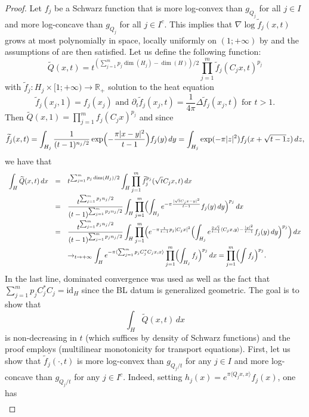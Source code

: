 \documentclass[11pt,a4paper,reqno]{amsart}
\numberwithin{equation}{section}
\theoremstyle{definition}
\newcommand{\nm}{\noalign{\smallskip}}
\newcommand{\ds}{\displaystyle}
\renewcommand{\tilde}{\widetilde}
\newcommand{\<}{\ensuremath \leq}
\renewcommand{\>}{\ensuremath \geq}
\renewcommand{\tilde}{\widetilde}
\begin{document}
\begin{proof}
Let $f_j$ be a Schwarz function that is more log-convex than $g_{Q_j}$ for all $j \in I$ and more log-concave than $g_{Q_j}$ for all $j \in I^c$. This implies that $\nabla \log \tilde f_j(x,t)$ grows at most polynomially in space, locally uniformly on $(1;+\infty)$ by \cite{Vald2} and the assumptions of \cite[Lemma 2.6]{BCCT} are then satisfied.
Let us define the following function:
$$\tilde Q(x,t)=t^{(\sum_{j=1}^m p_j\dim(H_j)-\dim(H))/2}\prod_{j=1}^m \tilde f_j(C_jx,t)^{p_j}$$ with $\tilde f_j: H_j \times [1;+\infty) \rightarrow \mathbb{R}_+$ solution to the heat equation  $$\tilde f_j(x_j,1)=f_j(x_j) \text{ and } \partial_t \tilde f_j(x_j,t)=\frac{1}{4\pi}\Delta \tilde f_j(x_j,t) \text{ for } t>1.$$
Then $\tilde Q(x,1)= \prod_{j=1}^m f_j(C_jx)^{p_j}$ and since $$\tilde f_j(x,t)=\int_{H_j}\frac{1}{(t-1)^{n_j/2}}\exp \Bigl(-\frac{\pi|x-y|^2}{t-1} \Bigl) f_j(y)\, dy=\int_{H_j}\exp(-\pi|z|^2)f_j(x+\sqrt{t-1}z)\, dz,$$ we have that $$\begin{array}{lll}
\ds \int_H \tilde Q(x,t)\, dx &=& \ds t^{\sum_{j=1}^m p_j\dim(H_j)/2}\int_H \prod_{j=1}^m \tilde f_j^{p_j}(\sqrt{t}C_jx,t)\, dx \\
\nm 
&=& \ds \frac{t^{\sum_{j=1}^m p_jn_j/2}}{(t-1)^{\sum_{j=1}^m p_jn_j/2}}\int_H \prod_{j=1}^m \Bigl( \int_{H_j} e^{-\pi \frac{|\sqrt{t} C_jx-y|^2}{t-1}} f_j(y)\, dy \Bigl)^{p_j}\, dx \\
\nm 
&=& \ds \frac{t^{\sum_{j=1}^m p_jn_j/2}}{(t-1)^{\sum_{j=1}^m p_jn_j/2}} \int_H \prod_{j=1}^m \Bigl( e^{-\pi \frac{t}{t-1}p_j|C_jx|^2} \Bigl(\int_{H_j}  e^{\frac{2\sqrt{t}}{t-1}\langle C_jx,y\rangle-\frac{|y|^2}{t-1}}f_j(y)\, dy\Bigl)^{p_j} \Bigl)\, dx\\
\nm 
&& \ds \rightarrow_{t \rightarrow +\infty} \int_H e^{-\pi \langle \sum_{j=1}^m p_jC_j^*C_jx,x\rangle}\prod_{j=1}^m \Bigl(\int_{H_j}f_j\Bigl)^{p_j}\, dx = \prod_{j=1}^m \Bigl( \int f_j \Bigl)^{p_j}.
\end{array}$$ In the last line, dominated convergence was used as well as the fact that $\sum_{j=1}^m p_jC_j^*C_j=\mathrm{id}_H$ since the BL datum is generalized geometric.
The goal is to show that $$\int_H \tilde Q(x,t)\, dx$$ is non-decreasing in $t$ (which suffices by density of Schwarz functions) and the proof employs \cite[Lemma 2.6]{BCCT} (multilinear monotonicity for transport equations).
First, let us show that $\tilde f_j(\cdot,t)$ is more log-convex than $g_{Q_j/t}$ for any $j \in I$ and more log-concave than $g_{Q_j/t}$ for any $j \in I^c.$ Indeed, setting $h_j(x)=e^{\pi \langle Q_jx,x\rangle}f_j(x)$, one has $$\begin{array}{lll}

\end{array}$$
\end{proof}
\end{document}
